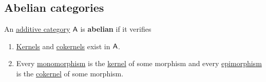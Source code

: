 \documentclass[../../../main]{subfiles}
\begin{document}
\subsection{Abelian categories}
\begin{definition} \label{def:abelian-category}
  An \hyperref[def:additive-category]{additive category} \(\mathsf{A}\) is \textbf{abelian} if it verifies
  \begin{enumerate}
    \item[A.4)]\label{axiom:abelian-existence} \hyperref[def:categorical-kernel]{Kernels} and \hyperref[def:categorical-cokernel]{cokernels} exist in \(\mathsf{A}\).
    \item[A.5)]\label{axiom:abelian-morphisms} Every \hyperref[def:mono-epi-morphism]{monomorphism} is the \hyperref[def:categorical-kernel]{kernel} of some morphism and every \hyperref[def:mono-epi-morphism]{epimorphism} is the \hyperref[def:categorical-cokernel]{cokernel} of some morphism.
  \end{enumerate}
\end{definition}
\end{document}
